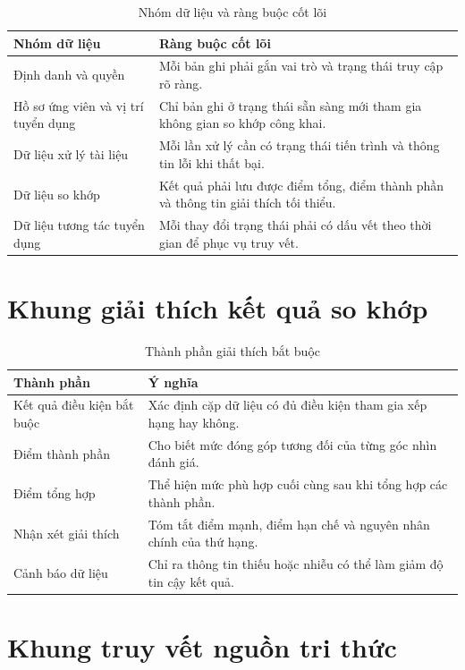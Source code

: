 \begin{table}[H]
\caption{Nhóm dữ liệu và ràng buộc cốt lõi}
\centering
\begin{tabularx}{\textwidth}{p{}X}
\toprule
\textbf{Nhóm dữ liệu} & \textbf{Ràng buộc cốt lõi}\\
\midrule
Định danh và quyền & Mỗi bản ghi phải gắn vai trò và trạng thái truy cập rõ ràng.\\
Hồ sơ ứng viên và vị trí tuyển dụng & Chỉ bản ghi ở trạng thái sẵn sàng mới tham gia không gian so khớp công khai.\\
Dữ liệu xử lý tài liệu & Mỗi lần xử lý cần có trạng thái tiến trình và thông tin lỗi khi thất bại.\\
Dữ liệu so khớp & Kết quả phải lưu được điểm tổng, điểm thành phần và thông tin giải thích tối thiểu.\\
Dữ liệu tương tác tuyển dụng & Mỗi thay đổi trạng thái phải có dấu vết theo thời gian để phục vụ truy vết.\\
\bottomrule
\end{tabularx}
\end{table}

\section{Khung giải thích kết quả so khớp}

\begin{table}[H]
\caption{Thành phần giải thích bắt buộc}
\centering
\begin{tabularx}{\textwidth}{p{}X}
\toprule
\textbf{Thành phần} & \textbf{Ý nghĩa}\\
\midrule
Kết quả điều kiện bắt buộc & Xác định cặp dữ liệu có đủ điều kiện tham gia xếp hạng hay không.\\
Điểm thành phần & Cho biết mức đóng góp tương đối của từng góc nhìn đánh giá.\\
Điểm tổng hợp & Thể hiện mức phù hợp cuối cùng sau khi tổng hợp các thành phần.\\
Nhận xét giải thích & Tóm tắt điểm mạnh, điểm hạn chế và nguyên nhân chính của thứ hạng.\\
Cảnh báo dữ liệu & Chỉ ra thông tin thiếu hoặc nhiễu có thể làm giảm độ tin cậy kết quả.\\
\bottomrule
\end{tabularx}
\end{table}

\section{Khung truy vết nguồn tri thức}

